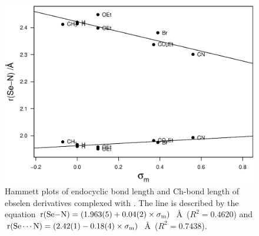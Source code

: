 \begin{refsection}
\begin{figure}
\centering
\includegraphics[width=0.7\linewidth]{Figures/hammett-morph-meta.eps}
\caption[Hammett plots of endocyclic  bond length and  Ch-bond length of ebselen derivatives complexed with .]{Hammett plots of endocyclic  bond length and  Ch-bond length of ebselen derivatives complexed with . The line is described by the equation $\mathrm{r}(\ce{Se-N}) = (1.963(5) + 0.04(2) \times \sigma_\text{m})$~\AA~($R^2=0.4620$) and $\mathrm{r}(\ce{Se\cdots N}) = (2.42(1) - 0.18(4) \times \sigma_\text{m})$~\AA~($R^2=0.7438$).}\label{fig:hammett-morph-meta}
\end{figure}

\begin{table}
  \caption{Linear regression results for Hammett plots in \cref{fig:hammett-dmap-meta,fig:hammett-pyrrol-meta,fig:hammett-morph-meta}.}
  \label{tab:hammett-results-meta}
\end{table}


\end{refsection}
